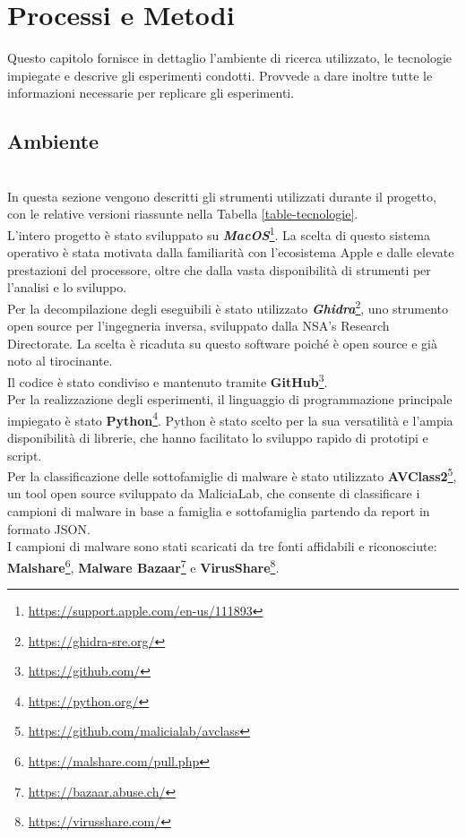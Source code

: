 \chapter{Processi e Metodi}
\label{cap:processi-metodologie}

\indent Questo capitolo fornisce in dettaglio l'ambiente di ricerca utilizzato, le tecnologie impiegate e descrive gli esperimenti condotti. 
Provvede a dare inoltre tutte le informazioni necessarie per replicare gli esperimenti.

\section{Ambiente}  
~\\  
\indent In questa sezione vengono descritti gli strumenti utilizzati durante il progetto, con le relative versioni riassunte nella Tabella \ref{table-tecnologie}.  
\\  
L'intero progetto è stato sviluppato su \textbf{\emph{MacOS}}\footnote{\url{https://support.apple.com/en-us/111893}}. La scelta di questo sistema operativo è stata motivata dalla familiarità con l'ecosistema Apple e dalle elevate prestazioni del processore, oltre che dalla vasta disponibilità di strumenti per l'analisi e lo sviluppo.  
\\  
Per la decompilazione degli eseguibili è stato utilizzato \textbf{\emph{Ghidra}}\footnote{\url{https://ghidra-sre.org/}}, uno strumento open source per l'ingegneria inversa, sviluppato dalla NSA's Research Directorate. La scelta è ricaduta su questo software poiché è open source e già noto al tirocinante.  
\\  
Il codice è stato condiviso e mantenuto tramite \textbf{GitHub}\footnote{\url{https://github.com/}}.  
\\  
Per la realizzazione degli esperimenti, il linguaggio di programmazione principale impiegato è stato \textbf{Python}\footnote{\url{https://python.org/}}. Python è stato scelto per la sua versatilità e l'ampia disponibilità di librerie, che hanno facilitato lo sviluppo rapido di prototipi e script.  
\\  
Per la classificazione delle sottofamiglie di malware è stato utilizzato \textbf{AVClass2}\footnote{\url{https://github.com/malicialab/avclass}}, un tool open source sviluppato da MaliciaLab, che consente di classificare i campioni di malware in base a famiglia e sottofamiglia partendo da report in formato JSON.  
\\  
I campioni di malware sono stati scaricati da tre fonti affidabili e riconosciute: \textbf{Malshare}\footnote{\url{https://malshare.com/pull.php}}, \textbf{Malware Bazaar}\footnote{\url{https://bazaar.abuse.ch/}} e \textbf{VirusShare}\footnote{\url{https://virusshare.com/}}.  
